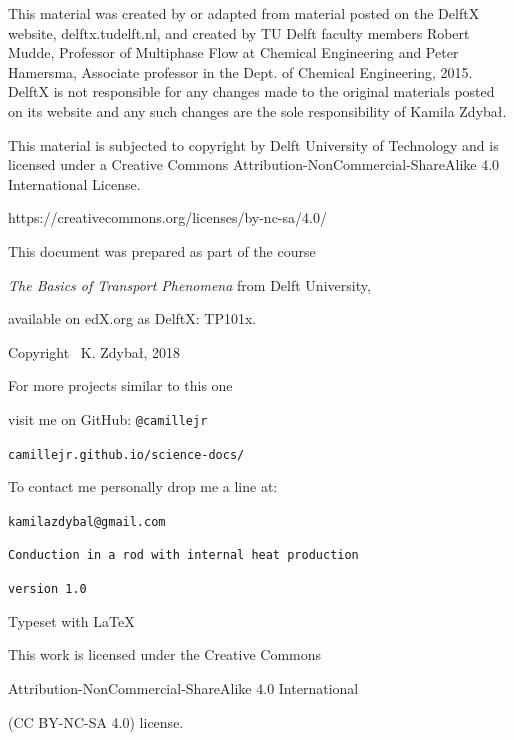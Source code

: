 \documentclass[10pt]{article}
\begin{document}
\setlength{\parskip}{0.0em}
\setlength{\parindent}{0cm}

\newpage

\thispagestyle{empty}

\vspace*{1cm}

This material was created by or adapted from material posted on the DelftX website, delftx.tudelft.nl, and created by TU Delft faculty members Robert Mudde, Professor of Multiphase Flow at Chemical Engineering and Peter Hamersma, Associate professor in the Dept. of Chemical Engineering, 2015. DelftX is not responsible for any changes made to the original materials posted on its website and any such changes are the sole responsibility of Kamila Zdybał.

This material is subjected to copyright by Delft University of Technology and is licensed under a Creative Commons Attribution-NonCommercial-ShareAlike 4.0 International License.

https://creativecommons.org/licenses/by-nc-sa/4.0/

\begin{center}
\vspace*{5cm}

This document was prepared as part of the course 

\textit{The Basics of Transport Phenomena} from Delft University, 

available on edX.org as DelftX: TP101x.

Copyright \textcopyright \, K. Zdybał, 2018

For more projects similar to this one

visit me on GitHub: \verb|@camillejr|

\verb|camillejr.github.io/science-docs/|

To contact me personally drop me a line at:

\verb|kamilazdybal@gmail.com|

\vspace*{2cm}

\verb|Conduction in a rod with internal heat production|

\verb|version 1.0|

Typeset with \LaTeX

\vspace*{1.8cm}

\noindent This work is licensed under the Creative Commons

Attribution-NonCommercial-ShareAlike 4.0 International 

(CC BY-NC-SA
4.0) license.
\end{center}
\end{document}
